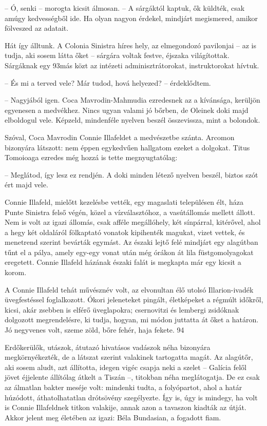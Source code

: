 \documentclass{IEEEtran}
\begin{document}
– Ó, senki – morogta kicsit álmosan. – A sárgáktól kaptuk, ők küldték, csak
amúgy kedvességből ide. Ha olyan nagyon érdekel, mindjárt megismered, amikor
fölveszed az adatait.

Hát így álltunk. A Colonia Sinistra híres hely, az elmegondozó pavilonjai – az
is tudja, aki sosem látta őket – sárgára voltak festve, éjszaka világítottak.
Sárgáknak egy 93más közt az intézeti adminisztrátorokat, instruktorokat
hívtuk.

– És mi a terved vele? Már tudod, hová helyezed? – érdeklődtem.

– Nagyjából igen. Coca Mavrodin-Mahmudia ezredesnek az a kívánsága, kerüljön
egyenesen a medvékhez. Nincs ugyan valami jó bőrben, de Oleinek doki majd
elboldogul vele. Képzeld, mindenféle nyelven beszél összevissza, mint a
bolondok.

Szóval, Coca Mavrodin Connie Illafeldet a medvészetbe szánta. Arcomon
bizonyára látszott: nem éppen egykedvűen hallgatom ezeket a dolgokat. Titus
Tomoioaga ezredes még hozzá is tette megnyugtatólag:

– Meglátod, így lesz ez rendjén. A doki minden létező nyelven beszél, biztos
szót ért majd vele.

Connie Illafeld, mielőtt kezelésbe vették, egy magaslati településen élt, háza
Punte Sinistra felső végén, közel a vízválasztóhoz, a vasútállomás mellett
állott. Nem is volt az igazi állomás, csak afféle megállóhely, két sínpárral,
kitérővel, ahol a hegy két oldaláról fölkaptató vonatok kipihenték magukat,
vizet vettek, és menetrend szerint bevárták egymást. Az északi lejtő felé
mindjárt egy alagútban tűnt el a pálya, amely egy-egy vonat után még órákon át
lila füstgomolyagokat eregetett. Connie Illafeld házának északi falát is
megkapta már egy kicsit a korom.

A Connie Illafeld tehát művésznév volt, az elvonultan élő utolsó
Illarion-ivadék üvegfestéssel foglalkozott. Ókori jeleneteket pingált,
életképeket a régmúlt időkről, kicsi, akár zsebben is elférő üveglapokra;
csernovitzi és lembergi zsidóknak dolgozott megrendelésre, ki tudja, hogyan,
mi módon juttatta át őket a határon. Jó negyvenes volt, szeme zöld, bőre
fehér, haja fekete.
94

Erdőkerülők, utászok, átutazó hivatásos vadászok néha bizonyára
megkörnyékezték, de a látszat szerint valakinek tartogatta magát. Az alagútőr,
aki sosem aludt, azt állította, idegen vigéc csapja neki a szelet – Galícia
felől jövet éjjelente állítólag átkelt a Tiszán –, titokban néha meglátogatja.
De ez csak az álmatlan bakter meséje volt: mindenki tudta, a folyópartot, ahol
a határ húzódott, áthatolhatatlan drótsövény szegélyezte. Így is, úgy is
mindegy, ha volt is Connie Illafeldnek titkon valakije, annak azon a tavaszon
kiadták az útját. Akkor jelent meg életében az igazi: Béla Bundasian, a
fogadott fiam.
\end{document}

